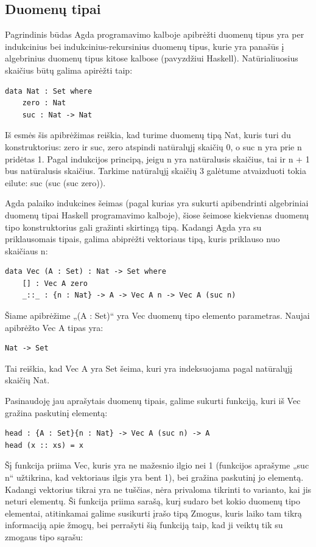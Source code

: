 \documentclass{VUMIFPSkursinis}
\begin{document}
\subsection{Duomenų tipai}
Pagrindinis būdas Agda programavimo kalboje apibrėžti duomenų tipus yra per indukcinius bei indukcinius-rekursinius duomenų tipus, kurie yra panašūs į algebrinius duomenų tipus kitose kalbose (pavyzdžiui Haskell). Natūrialiuosius skaičius būtų galima apirėžti taip:
\begin{lstlisting}
data Nat : Set where
	zero : Nat
	suc : Nat -> Nat
\end{lstlisting}
Iš esmės šis apibrėžimas reiškia, kad turime duomenų tipą Nat, kuris turi du konstruktorius: zero ir suc, zero atspindi natūralųjį skaičių 0, o suc n yra prie n pridėtas 1. Pagal indukcijos principą, jeigu n yra natūralusis skaičius, tai ir n + 1 bus natūralusis skaičius. Tarkime natūralųjį skaičių 3 galėtume atvaizduoti tokia eilute: suc (suc (suc zero)).\par Agda palaiko indukcines šeimas (pagal kurias yra sukurti apibendrinti algebriniai duomenų tipai Haskell programavimo kalboje), šiose šeimose kiekvienas duomenų tipo konstruktorius gali gražinti skirtingą tipą. Kadangi Agda yra su priklausomais tipais, galima abiprėžti vektoriaus tipą, kuris priklauso nuo skaičiaus n:
\begin{lstlisting}
data Vec (A : Set) : Nat -> Set where
	[] : Vec A zero
	_::_ : {n : Nat} -> A -> Vec A n -> Vec A (suc n)
\end{lstlisting}
Šiame apibrėžime „(A : Set)“ yra Vec duomenų tipo elemento parametras. Naujai apibrėžto Vec A tipas yra:
\begin{lstlisting}
Nat -> Set
\end{lstlisting}
Tai reiškia, kad Vec A yra Set šeima, kuri yra indeksuojama pagal natūralųjį skaičių Nat.
\par Pasinaudoję jau aprašytais duomenų tipais, galime sukurti funkciją, kuri iš Vec gražina paskutinį elementą:
\begin{lstlisting}
head : {A : Set}{n : Nat} -> Vec A (suc n) -> A
head (x :: xs) = x
\end{lstlisting}
Šį funkcija priima Vec, kuris yra ne mažesnio ilgio nei 1 (funkcijos aprašyme „suc n“ užtikrina, kad vektoriaus ilgis yra bent 1), bei gražina paskutinį jo elementą. Kadangi vektorius tikrai yra ne tuščias, nėra privaloma tikrinti to varianto, kai jis neturi elementų. Ši funkcija priima sarašą, kurį sudaro bet kokio duomenų tipo elementai, atitinkamai galime susikurti įrašo tipą Zmogus, kuris laiko tam tikrą informaciją apie žmogų, bei perrašyti šią funkciją taip, kad ji veiktų tik su zmogaus tipo sąrašu:
\end{document}
